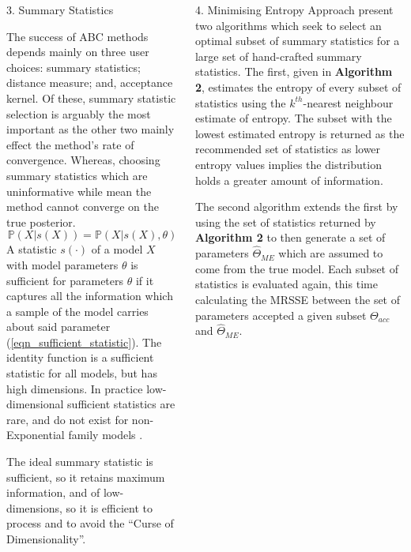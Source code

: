 \documentclass[ %
                  author={Dominic Hutchinson},
                supervisor={Dr. Daniel Lawson \& Dr. Sam Tickle},
                    degree={MEng Maths and Computer Science},
                     title={Bayesian Modelling of Epidemic Events},
                  subtitle={Summary Statistic Selection for Approximate Bayesian Computation Methods},
                      type={},
                      year={2021}
               ]{poster}
\begin{document}
\begin{frame}{}
\begin{columns}[t]
\begin{column}{0.475\linewidth}
      \begin{block}{\Large 3. Summary Statistics}

        The success of ABC methods depends mainly on three user choices: summary statistics; distance measure; and, acceptance kernel. Of these, summary statistic selection is arguably the most important as the other two mainly effect the method's rate of convergence. Whereas, choosing summary statistics which are uninformative while mean the method cannot converge on the true posterior.
        \begin{equation}\label{eqn_sufficient_statistic}
          \mathbb{P}(X|s(X))=\mathbb{P}(X|s(X),\theta)
        \end{equation}
        A statistic $s(\cdot)$ of a model $X$ with model parameters $\theta$ is sufficient for parameters $\theta$ if it captures all the information which a sample of the model carries about said parameter (\ref{eqn_sufficient_statistic}). The identity function is a sufficient statistic for all models, but has high dimensions. In practice low-dimensional sufficient statistics are rare, and do not exist for non-Exponential family models \cite[]{pkd_theorem_pitman_part}.
        \par The ideal summary statistic is sufficient, so it retains maximum information, and of low-dimensions, so it is efficient to process and to avoid the ``Curse of Dimensionality''.

      \end{block}

    \end{column}

    \begin{column}{0.475\linewidth}

      \begin{block}{\Large 4. Minimising Entropy Approach}
        \cite[]{on_optimal_selection_of_summary_stats_for_ABC} present two algorithms which seek to select an optimal subset of summary statistics for a large set of hand-crafted summary statistics. The first, given in \textbf{Algorithm 2}, estimates the entropy of every subset of statistics using the $k^{th}$-nearest neighbour estimate of entropy. The subset with the lowest estimated entropy is returned as the recommended set of statistics as lower entropy values implies the distribution holds a greater amount of information.
        \par The second algorithm extends the first by using the set of statistics returned by \textbf{Algorithm 2} to then generate a set of parameters $\hat\Theta_{ME}$ which are assumed to come from the true model. Each subset of statistics is evaluated again, this time calculating the MRSSE between the set of parameters accepted a given subset $\Theta_{acc}$ and $\hat\Theta_{ME}$.
      \end{block}


\end{column}
\end{columns}
\end{frame}
\end{document}
